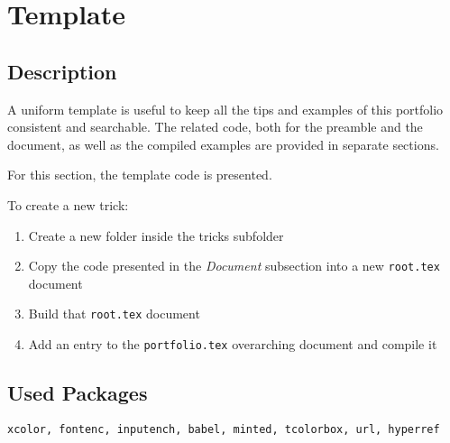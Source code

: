 \documentclass{article}
\begin{document}
	
	\section*{Template}
	
	\subsection*{Description}
	A uniform template is useful to keep all the tips and examples of this portfolio consistent and searchable. The related code, both for the preamble and the document, as well as the compiled examples are provided in separate sections.
	
	For this section, the template code is presented.
	
	To create a new trick:
	\begin{enumerate}
		\item Create a new folder inside the tricks subfolder
		\item Copy the code presented in the \textit{Document} subsection into a new \texttt{root.tex} document
		\item Build that \texttt{root.tex} document
		\item Add an entry to the \texttt{portfolio.tex} overarching document and compile it
	\end{enumerate}
	
	\subsection*{Used Packages}
	\verb|xcolor, fontenc, inputench, babel, minted, tcolorbox, url, hyperref|
	
\end{document}

